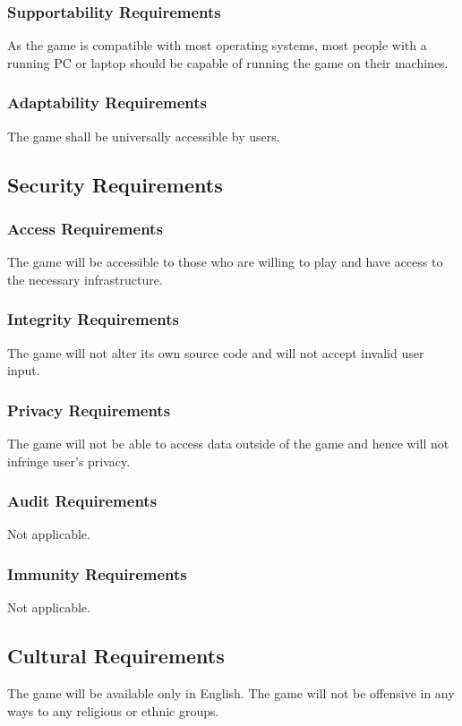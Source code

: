 \documentclass{article}
\begin{document}
\subsubsection{Supportability Requirements}
As the game is compatible with most operating systems, most people with a running PC or laptop should be capable of running the game on their machines. %
\subsubsection{Adaptability Requirements}
The game shall be universally accessible by users. %

\subsection{Security Requirements}
\subsubsection{Access Requirements}
The game will be accessible to those who are willing to play and have access to the necessary infrastructure. %
\subsubsection{Integrity Requirements}
The game will not alter its own source code and will not accept invalid user input.
\subsubsection{Privacy Requirements}
The game will not be able to access data outside of the game and hence will not infringe user’s privacy. %
\subsubsection{Audit Requirements}
Not applicable.%
\subsubsection{Immunity Requirements}
Not applicable.%

\subsection{Cultural Requirements}
The game will be available only in English. The game will not be offensive in any ways to any religious or ethnic groups.
\end{document}
